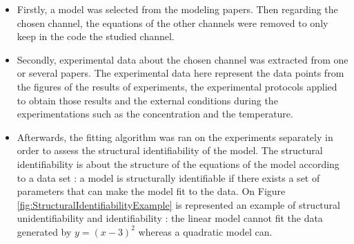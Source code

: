 \documentclass[11pt]{report}
\begin{document}
\begin{itemize}

    \item Firstly, a model was selected from the modeling papers. Then regarding the chosen channel, the equations of the other channels were removed to only keep in the code the studied channel.
    
    \item Secondly, experimental data about the chosen channel was extracted from one or several papers. The experimental data here represent the data points from the figures of the results of experiments, the experimental protocols applied to obtain those results and the external conditions during the experimentations such as the concentration and the temperature.

    
    \item Afterwards, the fitting algorithm was ran on the experiments separately in order to assess the structural identifiability of the model. The structural identifiability is about the structure of the equations of the model according to a data set : a model is structurally identifiable if there exists a set of parameters that can make the model fit to the data. On Figure \ref{fig:StructuralIdentifiabilityExample} is represented an example of structural unidentifiability and identifiability : the linear model cannot fit the data generated by $y = (x-3)^2$ whereas a quadratic model can.
    

\end{itemize}
\end{document}
